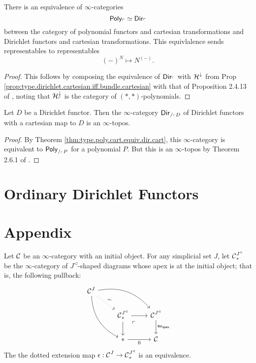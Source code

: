 \begin{thm}\label{thm:type.poly.cart.equiv.dir.cart}
  There is an equivalence of $\infty$-categories
  $$\mathsf{{Poly}}_{\ulcorner} \simeq \operatorname{\mathsf{{Dir}}}_{\ulcorner}$$
  between the category of polynomial functors and cartesian transformations and
  Dirichlet functors and cartesian transformations. This equivlalence sends
  representables to representables
  $$(-)^N \mapsto N^{(-)}.$$
\end{thm}
\begin{proof}
This follows by composing the equivalence of $\operatorname{\mathsf{{Dir}}}_{\ulcorner}$ with
$\operatorname{\mathcal{H}}^{\downarrow}$ from Prop
\ref{prop:type.dirichlet.cartesian.iff.bundle.cartesian} with that of
Proposition 2.4.13 of \cite{GHK:Analytic.Monads}, noting that
$\operatorname{\mathcal{H}}^{\downarrow}_{\ulcorner}$ is the category of $(\ast,\ast)$-polynomials. 
\end{proof}

\begin{cor}
  Let $D$ be a Dirichlet functor. Then the $\infty$-category
  $\operatorname{\mathsf{{Dir}}}_{/_{\ulcorner} D}$
  of Dirichlet functors with a cartesian map to $D$ is an $\infty$-topos.
\end{cor}
\begin{proof}
By Theorem \ref{thm:type.poly.cart.equiv.dir.cart}, this $\infty$-category is equivalent
to $\mathsf{{Poly}}_{/_{\ulcorner} P}$ for a polynomial $P$. But this is an
$\infty$-topos by Theorem 2.6.1 of \cite{GHK:Analytic.Monads}.
\end{proof}

\section{Ordinary Dirichlet Functors} \label{sec:ordinary.dirichlet.functors}






\section{Appendix}

\begin{lem}\label{lem:cone.initial.equivalence}
Let $\operatorname{\mathcal{C}}$ be an $\infty$-category with an initial object. For any simplicial set
$J$, let $\operatorname{\mathcal{C}}^{J^{\triangleleft}}_{\ast}$ be the $\infty$-category of
  $J^{\triangleleft}$-shaped diagrams whose apex is at the initial object; that
  is, the following pullback:
  \[
    \begin{tikzcd}
      \Ca^{J} \arrow[drr, bend left] \arrow[ddr, bend right] \arrow[dr,
      dotted, "\sim"] & & \\
      & \Ca^{J^{\triangleleft}}_{\ast} \arrow[d] \arrow[r] \arrow[dr, phantom,
      "\ulcorner" very near start] & \Ca^{J^{\triangleleft}} \arrow[d,
      "\term{ev}_{\term{apex}}"] \\
      & \ast \arrow[r, "0"'] & \Ca
    \end{tikzcd}
  \]
The the dotted extension map  $\epsilon : \operatorname{\mathcal{C}}^{J} \to \operatorname{\mathcal{C}}^{J^{\triangleleft}}_{\ast}$ is an equivalence.
\end{lem}

